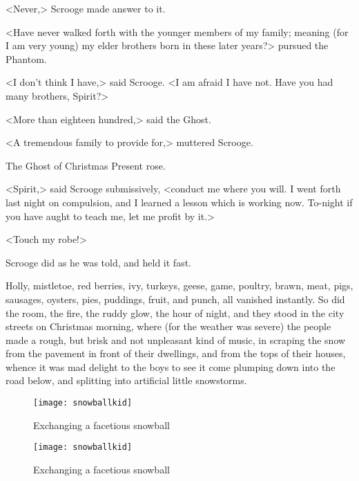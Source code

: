 <Never,> Scrooge made answer to it.

<Have never walked forth with the younger members of my family; meaning (for I am very young) my elder brothers born in these later years?> pursued the Phantom.

<I don't think I have,> said Scrooge. <I am afraid I have not. Have you had many brothers, Spirit?>

<More than eighteen hundred,> said the Ghost.

<A tremendous family to provide for,> muttered Scrooge.

The Ghost of Christmas Present rose.

<Spirit,> said Scrooge submissively, <conduct me where you will. I went forth last night on compulsion, and I learned a lesson which is working now. To-night if you have aught to teach me, let me profit by it.>

<Touch my robe!>

Scrooge did as he was told, and held it fast.

Holly, mistletoe, red berries, ivy, turkeys, geese, game, poultry, brawn, meat, pigs, sausages, oysters, pies, puddings, fruit, and  punch, all vanished instantly. So did the room, the fire, the ruddy glow, the hour of night, and they stood in the city streets on Christmas morning, where (for the weather was severe) the people made a rough, but brisk and not unpleasant kind of music, in scraping the snow from the pavement in front of their dwellings, and from the tops of their houses, whence it was mad delight to the boys to see it come plumping down into the road below, and splitting into artificial little snowstorms.

\begin{letter}
	\begin{figure}[tb]
	\centering
	\texttt{[image: snowballkid]}
	\caption{Exchanging a facetious snowball}
\end{figure}
\end{letter}

\begin{a4}
	\begin{figure}[tb]
	\centering
	\texttt{[image: snowballkid]}
	\caption{Exchanging a facetious snowball}
\end{figure}
\end{a4}




